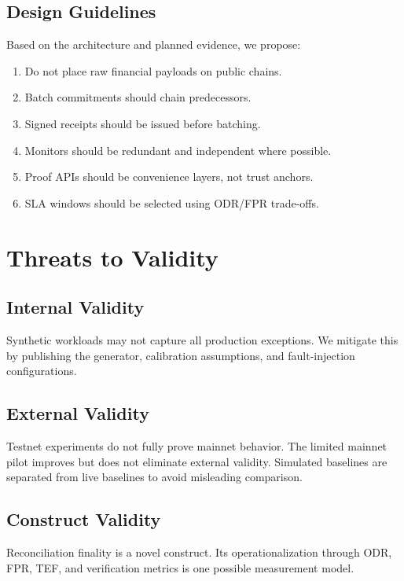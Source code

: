 \documentclass[journal]{IEEEtran}
\begin{document}
\subsection{Design Guidelines}
Based on the architecture and planned evidence, we propose:
\begin{enumerate}[nosep,leftmargin=2em]
    \item Do not place raw financial payloads on public chains.
    \item Batch commitments should chain predecessors.
    \item Signed receipts should be issued before batching.
    \item Monitors should be redundant and independent where possible.
    \item Proof APIs should be convenience layers, not trust anchors.
    \item SLA windows should be selected using ODR/FPR trade-offs.
\end{enumerate}

\section{Threats to Validity}
\label{sec:threats}

\subsection{Internal Validity}
Synthetic workloads may not capture all production exceptions. We mitigate this by publishing the generator, calibration assumptions, and fault-injection configurations.

\subsection{External Validity}
Testnet experiments do not fully prove mainnet behavior. The limited mainnet pilot improves but does not eliminate external validity. Simulated baselines are separated from live baselines to avoid misleading comparison.

\subsection{Construct Validity}
Reconciliation finality is a novel construct. Its operationalization through ODR, FPR, TEF, and verification metrics is one possible measurement model.
\end{document}
